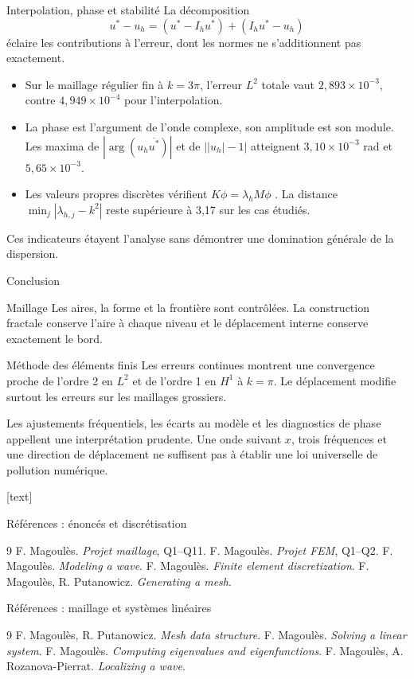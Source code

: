 \documentclass[12pt,aspectratio=169,t]{beamer}
\begin{document}
\begin{frame}{Interpolation, phase et stabilité}
La décomposition
\[
u^*-u_h=(u^*-I_hu^*)+(I_hu^*-u_h)
\]
éclaire les contributions à l'erreur, dont les normes ne s'additionnent pas exactement.
\begin{itemize}
\item Sur le maillage régulier fin à $k=3\pi$, l'erreur $L^2$ totale vaut $2,893\times10^{-3}$, contre $4,949\times10^{-4}$ pour l'interpolation.
\item La phase est l'argument de l'onde complexe, son amplitude est son module. Les maxima de $|\arg(u_h\overline{u^*})|$ et de $\bigl||u_h|-1\bigr|$ atteignent $3,10\times10^{-3}$ rad et $5,65\times10^{-3}$.
\item Les valeurs propres discrètes vérifient $K\phi=\lambda_hM\phi$ \cite{eigen}. La distance $\min_j|\lambda_{h,j}-k^2|$ reste supérieure à 3,17 sur les cas étudiés.
\end{itemize}
Ces indicateurs étayent l'analyse sans démontrer une domination générale de la dispersion.
\end{frame}

\begin{frame}{Conclusion}
\begin{block}{Maillage}
Les aires, la forme et la frontière sont contrôlées. La construction fractale conserve l'aire à chaque niveau et le déplacement interne conserve exactement le bord.
\end{block}
\begin{block}{Méthode des éléments finis}
Les erreurs continues montrent une convergence proche de l'ordre 2 en $L^2$ et de l'ordre 1 en $H^1$ à $k=\pi$. Le déplacement modifie surtout les erreurs sur les maillages grossiers.
\end{block}
Les ajustements fréquentiels, les écarts au modèle et les diagnostics de phase appellent une interprétation prudente. Une onde suivant $x$, trois fréquences et une direction de déplacement ne suffisent pas à établir une loi universelle de pollution numérique.
\end{frame}
[text]
\begin{frame}{Références : énoncés et discrétisation}
\begin{thebibliography}{9}
 F. Magoulès. \emph{Projet maillage}, Q1--Q11.
 F. Magoulès. \emph{Projet FEM}, Q1--Q2.
 F. Magoulès. \emph{Modeling a wave}.
 F. Magoulès. \emph{Finite element discretization}.
 F. Magoulès, R. Putanowicz. \emph{Generating a mesh}.
\end{thebibliography}
\end{frame}
\begin{frame}{Références : maillage et systèmes linéaires}
\begin{thebibliography}{9}
 F. Magoulès, R. Putanowicz. \emph{Mesh data structure}.
 F. Magoulès. \emph{Solving a linear system}.
 F. Magoulès. \emph{Computing eigenvalues and eigenfunctions}.
 F. Magoulès, A. Rozanova-Pierrat. \emph{Localizing a wave}.
\end{thebibliography}
\end{frame}
\end{document}
